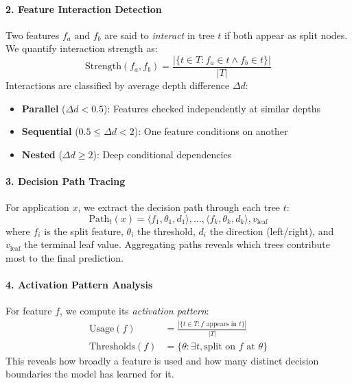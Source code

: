 \paragraph{2. Feature Interaction Detection}
Two features $f_a$ and $f_b$ are said to \emph{interact} in tree $t$ if both appear as split nodes. We quantify interaction strength as:
\begin{equation}
\text{Strength}(f_a, f_b) = \frac{|\{t \in T : f_a \in t \land f_b \in t\}|}{|T|}
\end{equation}
Interactions are classified by average depth difference $\Delta d$:
\begin{itemize}
    \item \textbf{Parallel} ($\Delta d < 0.5$): Features checked independently at similar depths
    \item \textbf{Sequential} ($0.5 \leq \Delta d < 2$): One feature conditions on another
    \item \textbf{Nested} ($\Delta d \geq 2$): Deep conditional dependencies
\end{itemize}

\paragraph{3. Decision Path Tracing}
For application $x$, we extract the decision path through each tree $t$:
\begin{equation}
\text{Path}_t(x) = \langle f_1, \theta_1, d_1 \rangle, \ldots, \langle f_k, \theta_k, d_k \rangle, v_{\text{leaf}}
\end{equation}
where $f_i$ is the split feature, $\theta_i$ the threshold, $d_i$ the direction (left/right), and $v_{\text{leaf}}$ the terminal leaf value. Aggregating paths reveals which trees contribute most to the final prediction.

\paragraph{4. Activation Pattern Analysis}
For feature $f$, we compute its \emph{activation pattern}:
\begin{align}
\text{Usage}(f) &= \frac{|\{t \in T : f \text{ appears in } t\}|}{|T|} \\
\text{Thresholds}(f) &= \{\theta : \exists t, \text{split on } f \text{ at } \theta\}
\end{align}
This reveals how broadly a feature is used and how many distinct decision boundaries the model has learned for it.

